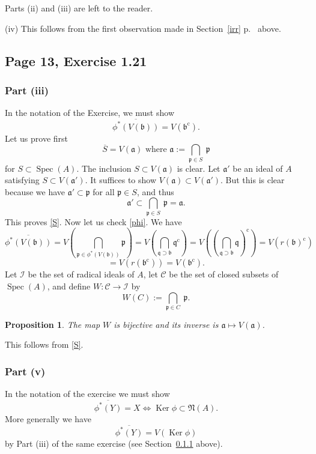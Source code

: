 \documentclass[parskip=half,fontsize=12pt]{scrartcl}%
\newcommand{\oo}{\operatorname}\newcommand{\ooo}{\operatorname*}
\newcommand{\mf}{\mathfrak}
\newcommand{\aaa}{\mf a}
\newcommand{\bbb}{\mf b}
\newcommand{\ppp}{\mf p}
\newcommand{\qqq}{\mf q}
\newcommand{\Ker}{\operatorname{Ker}}\newcommand{\Coker}{\operatorname{Coker}}
\newcommand{\Spec}{\operatorname{Spec}}\newcommand{\Sp}{\operatorname{Spec}}
\newtheorem{prop}[thm]{Proposition}
\begin{document}
Parts (ii) and (iii) are left to the reader.

(iv) This follows from the first observation made in Section~\ref{irr} p.~\pageref{irr} above.

\subsection{Page 13, Exercise 1.21}%

\subsubsection{Part (iii)}\label{121iii}%

In the notation of the Exercise, we must show 
\begin{equation}\label{phi}
\overline{\phi^*(V(\bbb))}=V(\bbb^{\oo c}).
\end{equation}
Let us prove first 
\begin{equation}\label{S}
\overline S=V(\aaa)\text{ where }\aaa:=\bigcap_{\ppp\in S}\ \ppp
\end{equation}
for $S\subset\Spec(A)$. The inclusion $S\subset V(\aaa)$ is clear. Let $\aaa'$ be an ideal of $A$ satisfying $S\subset V(\aaa')$. It suffices to show $V(\aaa)\subset V(\aaa')$. But this is clear because we have $\aaa'\subset\ppp$ for all $\ppp\in S$, and thus 
$$
\aaa'\subset\bigcap_{\ppp\in S}\ \ppp=\aaa.
$$ 
This proves \eqref{S}. Now let us check \eqref{phi}. We have 
$$
\overline{\phi^*(V(\bbb))}=V\left(\bigcap_{\ppp\in\phi^*(V(\bbb))}\ppp\right)=V\left(\bigcap_{\qqq\supset\bbb}\qqq^{\oo c}\right)=V\left(\left(\bigcap_{\qqq\supset\bbb}\qqq\right)^{\oo c}\right)=V(r(\bbb)^{\oo c})
$$
$$
=V(r(\bbb^{\oo c}))=V(\bbb^{\oo c}).
$$
Let $\mathcal I$ be the set of radical ideals of $A$, let $\mathcal C$ be the set of closed subsets of $\Spec(A)$, and define $W:\mathcal C\to\mathcal I$ by 
$$
W(C):=\bigcap_{\ppp\in C}\ \ppp.
$$ 
\begin{prop}\label{gal}
The map $W$ is bijective and its inverse is $\aaa\mapsto V(\aaa)$.
\end{prop}
This follows from \eqref{S}.

\subsubsection{Part (v)}\label{121v}%

In the notation of the exercise we must show 
$$
\overline{\phi^*(Y)}=X\iff\Ker\phi\subset\mf N(A).
$$ 
More generally we have 
$$
\overline{\phi^*(Y)}=V(\Ker\phi)
$$ 
by Part (iii) of the same exercise (see Section~\ref{121iii} above).
\end{document}

